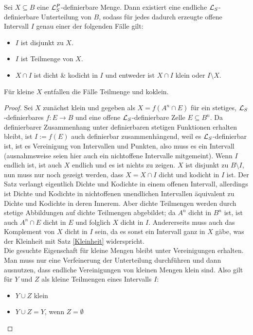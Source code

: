 \begin{theorem}\label{Satz 4}
	Sei $X\subseteq B$ eine $\mathcal{L}^P_S$-definierbare Menge. Dann existiert eine endliche $\mathcal{L}_S$-definierbare Unterteilung von $B$, sodass für jedes dadurch erzeugte offene Intervall $I$ genau einer der folgenden Fälle gilt:
	\begin{itemize}
		\item $I$ ist disjunkt zu $X$.
		\item $I$ ist Teilmenge von $X$.
		\item $X\cap I$ ist dicht \& kodicht in $I$ und entweder ist $X\cap I$ klein oder $I\setminus X$.
	\end{itemize}
	Für kleine $X$ entfallen die Fälle \glqq{}Teilmenge\grqq{} und \glqq{}koklein\grqq{}.
\end{theorem}
\begin{proof}
	Sei $X$ zunächst klein und gegeben als $X=f(A^n\cap E)$ für ein stetiges, $\mathcal{L}_S$-definierbares $f:E\rightarrow B$ und eine offene $\mathcal{L}_S$-definierbare Zelle $E\subseteq B^n$. Da definierbarer Zusammenhang unter definierbaren stetigen Funktionen erhalten bleibt, ist $I:=f(E)$ auch definierbar zusammenhängend, weil es $\mathcal{L}_S$-definierbar ist, ist es Vereinigung von Intervallen und Punkten, also muss es ein Intervall (ausnahmsweise seien hier auch ein nichtoffene Intervalle mitgemeint). Wenn $I$ endlich ist, ist auch $X$ endlich und es ist nichts zu zeigen. $X$ ist disjunkt zu $B\setminus I$, nun muss nur noch gezeigt werden, dass $X=X\cap I$ dicht und kodicht in $I$ ist. Der Satz verlangt eigentlich Dichte und Kodichte in einem offenen Intervall, allerdings ist Dichte und Kodichte in nichtoffenen unendlichen Intervallen äquivalent zu Dichte und Kodichte in deren Innerem. Aber dichte Teilmengen werden durch stetige Abbildungen auf dichte Teilmengen abgebildet; da $A^n$ dicht in $B^n$ ist, ist auch $A^n\cap E$ dicht in $E$ und folglich $X$ dicht in $I$. Andererseits muss auch das Komplement von $X$ dicht in $I$ sein, da es sonst ein Intervall ganz in $X$ gäbe, was der Kleinheit mit Satz \ref{Kleinheit} widerspricht.\\
	Die gesuchte Eigenschaft für kleine Mengen bleibt unter Vereinigungen erhalten. Man muss nur eine Verfeinerung der Unterteilung durchführen und dann ausnutzen, dass endliche Vereinigungen von kleinen Mengen klein sind. Also gilt für $Y$ und $Z$ als kleine Teilmengen eines Intervalls $I$:
	\begin{itemize}
		\item $Y\cup Z$ klein
		\item $Y\cup Z=Y$, wenn $Z=\emptyset$

\end{itemize}
\end{proof}
